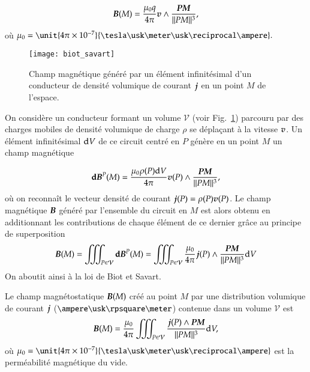 \begin{equation*}
	\vecb(M) = \dfrac{\mu_0 q}{4 \pi} \vecv \wedge \dfrac{\mitbf{PM}}{||PM||^3},
\end{equation*}
où $\mu_0 = \unit{4 \pi \times 10^{-7}}{\tesla \usk \meter \usk \reciprocal 
\ampere}.$

\begin{figure}[h!]
	\centering
	\texttt{[image: biot\_savart]}
	\caption{Champ magnétique généré par un élément infinitésimal d'un conducteur
	de densité volumique de courant $\vecj$ en un point $M$ de l'espace.}%
	\label{fig:magneto_biot_savart}
\end{figure}

On considère un conducteur formant un volume $\mathcal{V}$ 
(voir Fig.~\ref{fig:magneto_biot_savart}) parcouru par des charges mobiles 
de densité volumique de charge $\rho$ se déplaçant à la vitesse $\vecv$. Un élément 
infinitésimal $\mathrm{d}V$ de ce circuit centré en $P$ génère en un point $M$ un champ magnétique

\begin{equation*}
	\mathrm{\textbf{d}}\mitbf{B}^P(M) = \dfrac{\mu_0 \rho(P) \dV}
	{4 \pi} \vecv(P) \wedge 
	          \dfrac{\mitbf{PM}}{||PM||^3},
\end{equation*}
où on reconnaît le vecteur densité de courant $\vecj(P) = \rho(P) \vecv(P)$. 
Le champ magnétique
$\vecb$ généré par l'ensemble du circuit en $M$ est alors obtenu en additionnant les 
contributions de chaque élément de ce dernier grâce au principe de superposition
\begin{equation*}
	\vecb(M) = \iiint_{P \in \mathcal{V}} \mathrm{\textbf{d}}\mitbf{B}^P(M)
		 = \iiint_{P \in \mathcal{V}} \dfrac{\mu_0}
		 {4 \pi} \vecj(P) \wedge 
	          \dfrac{\mitbf{PM}}{||PM||^3} \dV
\end{equation*}
On aboutit ainsi à la loi de Biot et Savart.

\begin{defn}
	Le champ magnétostatique $\vecb(M)$ créé au point $M$ par une distribution
	volumique de courant $\vecj$ ($\ampere \usk \rpsquare \meter$) contenue
	dans un volume $\mathcal{V}$ est
	\begin{equation}
		\vecb(M) = \dfrac{\mu_0}{4 \pi} \iiint_{P \in \mathcal{V}} 
		\dfrac{\vecj(P) \wedge \mitbf{PM}}{||PM||^3} \dV,
	\end{equation}
	où $\mu_0 = \unit{4 \pi \times 10^{-7}}{\tesla \usk \meter \usk \reciprocal
	\ampere}$ est la perméabilité magnétique du vide.

\end{defn}

